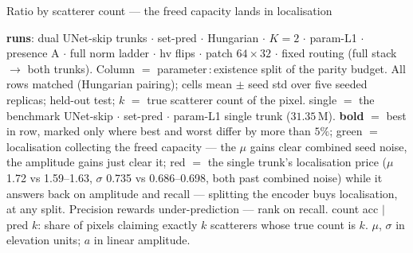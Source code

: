 \begin{frame}{Ratio by scatterer count --- the freed capacity lands in localisation}
  \parbox{0.82\textwidth}{\tiny\color{soft} \textbf{runs}: dual UNet-skip trunks $\cdot$ set-pred $\cdot$ Hungarian $\cdot$ $K{=}2$ $\cdot$ param-L1 $\cdot$ presence A $\cdot$ full norm ladder $\cdot$ hv flips $\cdot$ patch $64{\times}32$ $\cdot$ fixed routing (full stack $\to$ both trunks). Column $=$ parameter\,:\,existence split of the parity budget. All rows matched (Hungarian pairing); cells mean $\pm$ seed std over five seeded replicas; held-out test; $k$ $=$ true scatterer count of the pixel. single $=$ the benchmark UNet-skip $\cdot$ set-pred $\cdot$ param-L1 single trunk ($31.35$\,M). \textbf{bold} $=$ best in row, marked only where best and worst differ by more than $5\%$; \textcolor{good}{green} $=$ localisation collecting the freed capacity --- the $\mu$ gains clear combined seed noise, the amplitude gains just clear it; \textcolor{accent}{red} $=$ the single trunk's localisation price ($\mu$ 1.72 vs 1.59--1.63, $\sigma$ 0.735 vs 0.686--0.698, both past combined noise) while it answers back on amplitude and recall --- splitting the encoder buys localisation, at any split. Precision rewards under-prediction --- rank on recall. count acc $\mid$ pred $k$: share of pixels claiming exactly $k$ scatterers whose true count is $k$. $\mu$, $\sigma$ in elevation units; $a$ in linear amplitude.\par}
\end{frame}


